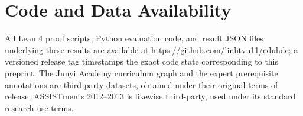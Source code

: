 \documentclass[10pt]{article}
\begin{document}
\section*{Code and Data Availability}

All Lean 4 proof scripts, Python evaluation code, and result JSON files underlying these results are available at \url{https://github.com/linhtvu11/eduhdc}; a versioned release tag timestamps the exact code state corresponding to this preprint. The Junyi Academy curriculum graph and the \citet{chang2015modeling} expert prerequisite annotations are third-party datasets, obtained under their original terms of release; ASSISTments 2012--2013 is likewise third-party, used under its standard research-use terms.



\end{document}
